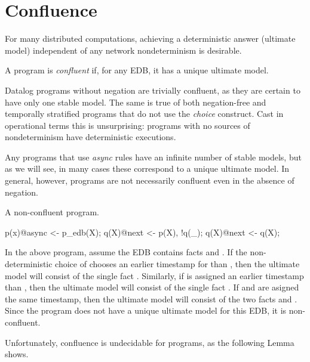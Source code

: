 \section{Confluence}

For many distributed computations, achieving a deterministic answer (ultimate model) independent of any network nondeterminism is desirable.

\begin{definition}
A \lang program is {\em confluent} if, for any EDB, it has a unique ultimate model.
\end{definition}

Datalog programs without negation are trivially confluent, as they are certain to have
only one stable model.  The same is true of both negation-free and temporally stratified \lang programs that do not use the  {\em choice} construct.  Cast in operational terms this is
unsurprising: programs with no sources of nondeterminism have deterministic executions.

Any \lang programs that use {\em async} rules have an infinite 
number of stable models, but as we will see, in many cases these correspond to a
unique ultimate model.
In general, however, \lang programs are not necessarily confluent even in the absence of negation.

\begin{example}
\label{ex:nonconfluent}
A non-confluent \lang program.

\begin{Dedalus}
p(x)@async <- p_edb(X);
q(X)@next <- p(X), !q(_);
q(X)@next <- q(X);
\end{Dedalus}
\end{example}

In the above program, assume the EDB contains facts  and .  If the non-deterministic choice of  chooses an earlier timestamp for  than , then the ultimate model will consist of the single fact .  Similarly, if  is assigned an earlier timestamp than , then the ultimate model will consist of the single fact .  If  and  are asigned the same timestamp, then the ultimate model will consist of the two facts  and .  Since the program does not have a unique ultimate model for this EDB, it is non-confluent.

Unfortunately, confluence is undecidable for \lang programs, as the following Lemma shows.

